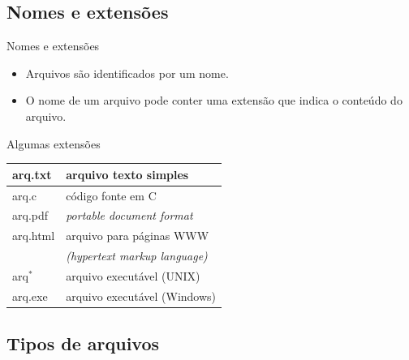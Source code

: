 \documentclass[handout]{beamer}
\begin{document}
\subsection{Nomes e extensões}

\begin{frame}{Nomes e extensões}

    \begin{itemize}
        \item Arquivos são identificados por um nome.
        \item O nome de um arquivo pode conter uma extensão que indica o
        conteúdo do arquivo.
    \end{itemize}

    \begin{block}{Algumas extensões}
        \begin{center}
            \begin{tabular}{| l | l | } \hline
              arq.txt & arquivo texto simples \\\hline
              arq.c & código fonte em C\\\hline
              arq.pdf & \textsl{portable document format}\\\hline
              arq.html & arquivo para páginas WWW \\
                      & \textsl{(hypertext markup language)}\\\hline
              arq$^*$ & arquivo executável (UNIX) \\\hline
              arq.exe & arquivo executável (Windows) \\\hline
            \end{tabular}
        \end{center}
    \end{block}

\end{frame}

\subsection{Tipos de arquivos}
\end{document}

